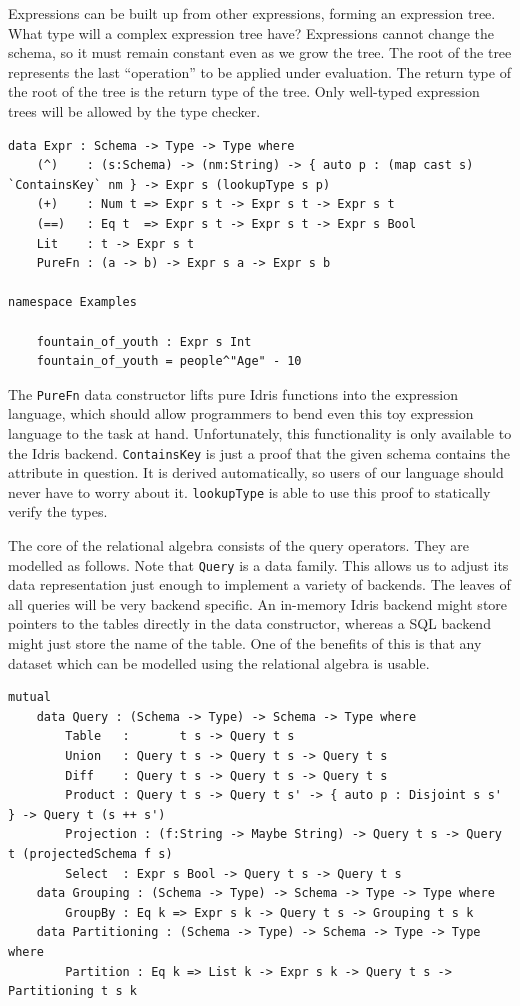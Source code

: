\documentclass[12pt]{article}
\begin{document}
Expressions can be built up from other expressions, forming an expression tree.
What type will a complex expression tree have?
Expressions cannot change the schema, so it must remain constant even as we grow the tree.
The root of the tree represents the last ``operation'' to be applied under evaluation.
The return type of the root of the tree is the return type of the tree.
Only well-typed expression trees will be allowed by the type checker.

\begin{lstlisting}
data Expr : Schema -> Type -> Type where
    (^)    : (s:Schema) -> (nm:String) -> { auto p : (map cast s) `ContainsKey` nm } -> Expr s (lookupType s p)
    (+)    : Num t => Expr s t -> Expr s t -> Expr s t
    (==)   : Eq t  => Expr s t -> Expr s t -> Expr s Bool
    Lit    : t -> Expr s t
    PureFn : (a -> b) -> Expr s a -> Expr s b

namespace Examples

    fountain_of_youth : Expr s Int
    fountain_of_youth = people^"Age" - 10
\end{lstlisting}

The \texttt{PureFn} data constructor lifts pure Idris functions into the expression language, which should allow programmers to bend even this toy expression language to the task at hand.
Unfortunately, this functionality is only available to the Idris backend.
\texttt{ContainsKey} is just a proof that the given schema contains the attribute in question.
It is derived automatically, so users of our language should never have to worry about it.
\texttt{lookupType} is able to use this proof to statically verify the types.


The core of the relational algebra consists of the query operators.
They are modelled as follows.
Note that \texttt{Query} is a data family.
This allows us to adjust its data representation just enough to implement a variety of backends.
The leaves of all queries will be very backend specific.
An in-memory Idris backend might store pointers to the tables directly in the data constructor, whereas a SQL backend might just store the name of the table.
One of the benefits of this is that any dataset which can be modelled using the relational algebra is usable.

\begin{lstlisting}
mutual
    data Query : (Schema -> Type) -> Schema -> Type where
        Table   :       t s -> Query t s
        Union   : Query t s -> Query t s -> Query t s
        Diff    : Query t s -> Query t s -> Query t s
        Product : Query t s -> Query t s' -> { auto p : Disjoint s s' } -> Query t (s ++ s')
        Projection : (f:String -> Maybe String) -> Query t s -> Query t (projectedSchema f s)
        Select  : Expr s Bool -> Query t s -> Query t s
    data Grouping : (Schema -> Type) -> Schema -> Type -> Type where
        GroupBy : Eq k => Expr s k -> Query t s -> Grouping t s k
    data Partitioning : (Schema -> Type) -> Schema -> Type -> Type where
        Partition : Eq k => List k -> Expr s k -> Query t s -> Partitioning t s k
\end{lstlisting}
\end{document}
